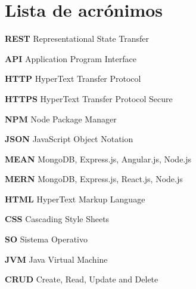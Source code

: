 \section*{Lista de acrónimos}

\noindent \textbf{REST} Representational State Transfer \newline \smallskip

\noindent \textbf{API} Application Program Interface \newline \smallskip 

\noindent \textbf{HTTP} HyperText Transfer Protocol \newline \smallskip

\noindent \textbf{HTTPS} HyperText Transfer Protocol Secure \newline \smallskip

\noindent \textbf{NPM} Node Package Manager \newline \smallskip

\noindent \textbf{JSON} JavaScript Object Notation \newline \smallskip

\noindent \textbf{MEAN} MongoDB, Express.js, Angular.js, Node.js \newline \smallskip 

\noindent \textbf{MERN} MongoDB, Express.js, React.js, Node.js \newline \smallskip

\noindent \textbf{HTML} HyperText Markup Language \newline \smallskip

\noindent \textbf{CSS} Cascading Style Sheets \newline \smallskip

\noindent \textbf{SO} Sistema Operativo \newline \smallskip

\noindent \textbf{JVM} Java Virtual Machine \newline \smallskip

\noindent \textbf{CRUD} Create, Read, Update and Delete \newline \smallskip